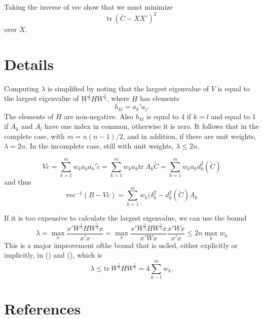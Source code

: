 \documentclass[
  12pt,
  letterpaper,
  DIV=11,
  numbers=noendperiod]{scrartcl}
\newcommand{\sectionbreak}{\clearpage}
\begin{document}
Taking the inverse of vec show that we must minimize \[
\text{tr}\ (\overline{C}-XX')^2
\] over \(X\).

\sectionbreak

\section{Details}\label{details}

Computing \(\lambda\) is simplified by noting that the largest
eigenvalue of \(V\) is equal to the largest eigenvalue of
\(W^\frac12HW^\frac12\), where \(H\) has elements \[
h_{kl}=a_k'a_l^{\ }.
\] The elements of \(H\) are non-negative. Also \(h_{kl}\) is equal to 4
if \(k=l\) and equal to 1 if \(A_k\) and \(A_l\) have one index in
common, otherwise it is zero. It follows that in the complete case, with
\(m=n(n-1)/2\), and in addition, if there are unit weights,
\(\lambda=2n\). In the incomplete case, still with unit weights,
\(\lambda\leq 2n\).

\[
V\tilde c=\sum_{k=1}^m w_ka_ka_k'\tilde c=\sum_{k=1}^m w_ka_k\text{tr}\ A_k\tilde C=\sum_{k=1}^m w_ka_kd_k^2(\tilde C)
\] and thus \[
\text{vec}^{-1}(B-V\tilde c)=\sum_{k=1}^m w_k(\delta_k^2-d_k^2(\tilde C)A_k
\]

If it is too expensive to calculate the largest eigenvalue, we can use
the bound \[
\lambda=\max_x
\frac{x'W^\frac12HW^\frac12x}{x'x}=
\max_x\frac{x'W^\frac12HW^\frac12x}{x'Wx}\frac{x'Wx}{x'x}\leq 2n\max_k w_k
\] This is a major improvement ofthe bound that is us3ed, either
explicitly or implicitly, in
() and
(),
which is \[
\lambda\leq\text{tr}\ W^\frac12HW^\frac12 = 4\sum_{k-1}^m w_k.
\]

\sectionbreak

\section*{References}\label{references}
\end{document}
